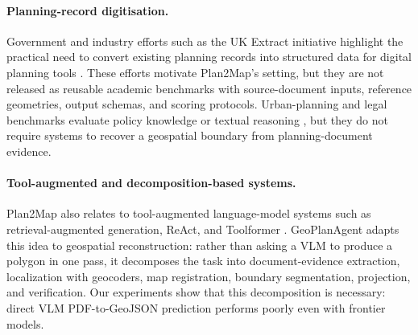 \documentclass[11pt]{article}
\begin{document}
\paragraph{Planning-record digitisation.}
Government and industry efforts such as the UK Extract initiative highlight the practical need to convert existing planning records into structured data for digital planning tools \citep{govuk2025extract,colebourn2025extract,google2025extract}. These efforts motivate Plan2Map's setting, but they are not released as reusable academic benchmarks with source-document inputs, reference geometries, output schemas, and scoring protocols. Urban-planning and legal benchmarks evaluate policy knowledge or textual reasoning \citep{zheng2025urbanplanbench,chalkidis2022lexglue,guha2023legalbench}, but they do not require systems to recover a geospatial boundary from planning-document evidence.

\paragraph{Tool-augmented and decomposition-based systems.}
Plan2Map also relates to tool-augmented language-model systems such as retrieval-augmented generation, ReAct, and Toolformer \citep{lewis2020rag,yao2023react,schick2023toolformer}. GeoPlanAgent adapts this idea to geospatial reconstruction: rather than asking a VLM to produce a polygon in one pass, it decomposes the task into document-evidence extraction, localization with geocoders, map registration, boundary segmentation, projection, and verification. Our experiments show that this decomposition is necessary: direct VLM PDF-to-GeoJSON prediction performs poorly even with frontier models.

\end{document}
